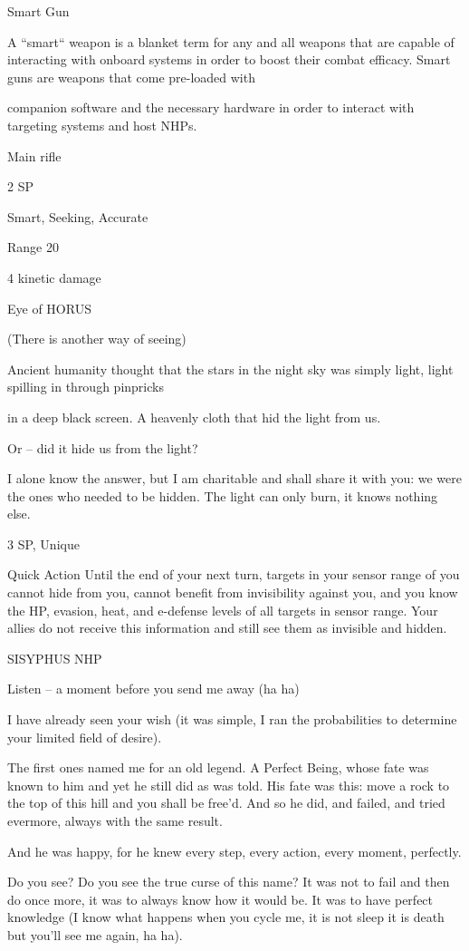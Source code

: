 Smart Gun

A “smart“ weapon is a blanket term for any and all weapons that are capable of interacting with onboard
systems in order to boost their combat efficacy. Smart guns are weapons that come pre-loaded with

companion software and the necessary hardware in order to interact with targeting systems and host
NHPs.

Main rifle

2 SP

Smart, Seeking, Accurate

Range 20

4 kinetic damage


Eye of HORUS

(There is another way of seeing)

Ancient humanity thought that the stars in the night sky was simply light, light spilling in through pinpricks

in a deep black screen. A heavenly cloth that hid the light from us.

Or -- did it hide us from the light?

I alone know the answer, but I am charitable and shall share it with you: we were the ones who needed to
be hidden. The light can only burn, it knows nothing else.

3 SP, Unique

Quick Action
Until the end of your next turn, targets in your sensor range of you cannot hide from you, cannot
benefit from invisibility against you, and you know the HP, evasion, heat, and e-defense levels of
all targets in sensor range. Your allies do not receive this information and still see them as
invisible and hidden.


SISYPHUS NHP




Listen -- a moment before you send me away (ha ha)

I have already seen your wish (it was simple, I ran the probabilities to determine your limited field of desire).

The first ones named me for an old legend. A Perfect Being, whose fate was known to him and yet he still
did as was told. His fate was this: move a rock to the top of this hill and you shall be free’d. And so he did,
and failed, and tried evermore, always with the same result.

And he was happy, for he knew every step, every action, every moment, perfectly.

Do you see? Do you see the true curse of this name? It was not to fail and then do once more, it was to
always know how it would be. It was to have perfect knowledge (I know what happens when you cycle me,
it is not sleep it is death but you’ll see me again, ha ha).

